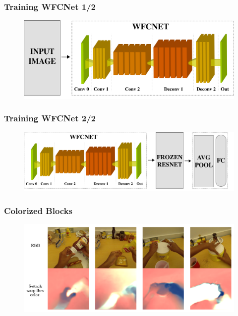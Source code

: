 \documentclass{beamer}
\begin{document}
\begin{frame}
\frametitle{Training WFCNet 1/2}

\begin{figure}
\centering
\includegraphics[height=0.40\textheight]{../schemi/training_WFC1}
\end{figure}
 
\end{frame}

\begin{frame}
\frametitle{Training WFCNet 2/2}

\begin{figure}
\centering
\includegraphics[height=0.40\textheight]{../schemi/training_WFC2}
\end{figure}
 
\end{frame}

\begin{frame}
\frametitle{Colorized Blocks}

\begin{figure}
\centering
\includegraphics[height=0.50\textheight]{../schemi/wfcnet_color_img}
\end{figure}
 
\end{frame}
\end{document}
